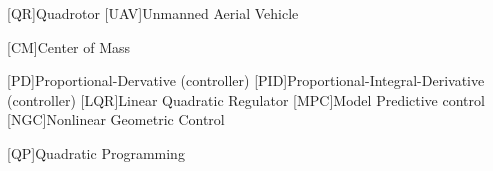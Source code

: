 
\begin{acronym}[\hspace{0.8in}] %
	
		[QR]{Quadrotor}
	[UAV]{Unmanned Aerial Vehicle}
	
	[CM]{Center of Mass}
	
	[PD]{Proportional-Dervative (controller)}
	[PID]{Proportional-Integral-Derivative (controller)}
	[LQR]{Linear Quadratic Regulator}
	[MPC]{Model Predictive control}
	[NGC]{Nonlinear Geometric Control}
	
	[QP]{Quadratic Programming}
	
	
\end{acronym}
	


%	

%
%
%	

%	
%	
%
%	
%
%	
%	
%	

